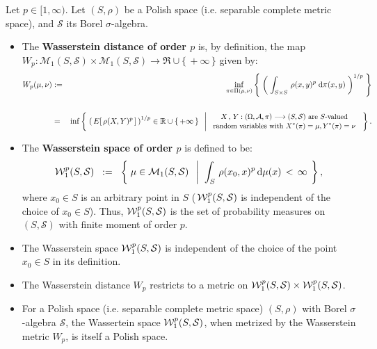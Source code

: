 \begin{definition}
\label{definition:WassersteinSpace}
\mbox{}\vskip 0.1cm
\noindent
Let $p \in [1,\infty)$.
Let $\left(S,\rho\right)$ be a Polish space (i.e. separable complete metric space),
and $\mathcal{S}$ its Borel $\sigma$-algebra.
\begin{itemize}
\item
	The \textbf{Wasserstein distance of order $p$} is, by definition, the map
	$W_{p} : \mathcal{M}_{1}\!\left(S,\mathcal{S}\right) \times \mathcal{M}_{1}\!\left(S,\mathcal{S}\right)
	\longrightarrow \Re\cup\{\,+\infty\,\}$
	given by:
	\begin{eqnarray*}
	W_{p}\!\left(\mu,\nu\right)
	& := &
	\inf_{\pi\in\Pi(\mu,\nu)}
	\left\{\;
	\left(\;
	\int_{S \times S}\,\rho(x,y)^{p} \;\textnormal{d}\pi(x,y)
	\;\right)^{1/p}
	\;\right\}
	\\ \\
	& = &
	\inf\left\{\;
	\left(\,E\!\left[\,\rho(X,Y)^{p}\,\right]\,\right)^{1/p} \in \mathbb{R}\cup\{\,+\infty\,\}
	\;\;\left\vert\;
	\begin{array}{c}
	\textnormal{\small$X\,,\,Y : (\Omega,\mathcal{A},\pi) \longrightarrow (S,\mathcal{S})$ are $S$-valued}
	\\
	\textnormal{\small random variables with $X^{*}(\pi) = \mu, Y^{*}(\pi) = \nu$}
	\end{array}
	\right.
	\;\right\}.
	\end{eqnarray*}
\item
	The \textbf{Wasserstein space of order $p$} is defined to be:
	\begin{equation*}
		\mathcal{W}^{p}_{1}\!\left(S,\mathcal{S}\right)
		\;\; := \;\;
		\left\{\;
		\mu \in \mathcal{M}_{1}\!\left(S,\mathcal{S}\right)
		\;\;\left\vert\;\;
		\int_{S}\,\rho(x_{0},x)^{p}\,\textnormal{d}\mu(x) \, < \, \infty
		\right.
		\;\right\},
	\end{equation*}
	where $x_{0} \in S$ is an arbitrary point in $S$
	(\,$\mathcal{W}^{p}_{1}\!\left(S,\mathcal{S}\right)$ is independent of the choice of $x_{0} \in S$).
	Thus, $\mathcal{W}^{p}_{1}\!\left(S,\mathcal{S}\right)$ is the set of probability measures
	on	$\left(S,\mathcal{S}\right)$ with finite moment of order $p$.
\end{itemize}
\end{definition}

\begin{theorem}
\label{theorem:WassersteinMetric}
\mbox{}\vskip0cm
\begin{itemize}
\item
	The Wasserstein space $\mathcal{W}^{p}_{1}\!\left(S,\mathcal{S}\right)$ is independent of the
	choice of the point $x_{0} \in S$ in its definition.
\item
	The Wasserstein distance $W_{p}$ restricts to a metric on
	$\mathcal{W}^{p}_{1}\!\left(S,\mathcal{S}\right) \times \mathcal{W}^{p}_{1}\!\left(S,\mathcal{S}\right)$.
\item
	For a Polish space (i.e. separable complete metric space) $(S,\rho)$
	with Borel $\sigma$-algebra $\mathcal{S}$,
	the Wassertein space $\mathcal{W}^{p}_{1}\!\left(S,\mathcal{S}\right)$,
	when metrized by the Wasserstein metric $W_{p}$, is itself a Polish space.
\end{itemize}
\end{theorem}

